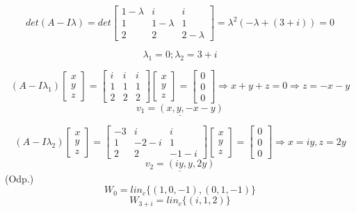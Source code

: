 \documentclass{article}
\begin{document}
$$det(A-I\lambda) = det\left[\begin{array}{ccc}1-\lambda&i&i\\1&1-\lambda&1\\2&2&2-\lambda\end{array}\right] = \lambda^2(-\lambda+(3+i)) = 0$$

$$\lambda_1 = 0 ; \lambda_2 = 3+i$$

$$(A-I\lambda_1)\left[\begin{array}{c}x\\y\\z\end{array}\right]=\left[\begin{array}{ccc}i&i&i\\1&1 &1\\2&2&2\end{array}\right]\left[\begin{array}{c}x\\y\\z \end{array}\right]= \left[\begin{array}{c}0\\0 \\0\end{array}\right] \Rightarrow x+y+z = 0 \Rightarrow z = -x-y $$
$$\underline{v_1 = (x,y,-x-y)}$$ \newline

$$(A-I\lambda_2)\left[\begin{array}{c}x\\y\\z\end{array}\right]=\left[\begin{array}{ccc}-3&i&i\\1&-2-i &1\\2&2&-1-i\end{array}\right]\left[\begin{array}{c}x\\y\\z \end{array}\right]= \left[\begin{array}{c}0\\0 \\0\end{array}\right] \Rightarrow x = iy, z = 2y $$
$$\underline{v_2 = (iy,y,2y)}$$
\newline
\centering
(Odp.)
$$W_0 = lin_c\{(1,0,-1),(0,1,-1)\}$$
$$W_{3+i} = lin_c \{(i,1,2)\}$$
\end{document}
